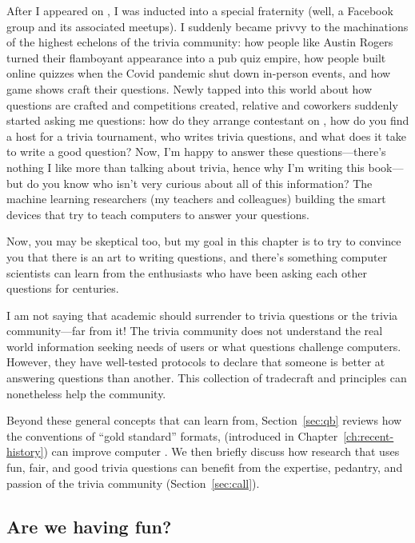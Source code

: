 

After I appeared on \jeopardyp{}, I was inducted into a special fraternity (well, a Facebook group and its associated meetups).
%
I suddenly became privvy to the machinations of the highest echelons of the trivia community: how people like Austin Rogers turned their flamboyant appearance into a pub quiz empire, how people built online quizzes when the Covid pandemic shut down in-person events, and how game shows craft their questions.
%
Newly tapped into this world about how questions are crafted and competitions created, relative and coworkers suddenly started asking me questions: how do they arrange contestant on \jeopardyp{}, how do you find a host for a trivia tournament, who writes trivia questions, and what does it take to write a good question?
%
Now, I'm happy to answer these questions---there's nothing I like more than talking about trivia, hence why I'm writing this book---but do you know who isn't very curious about all of this information?
%
The machine learning researchers (my teachers and colleagues) building the smart devices that try to teach computers to answer your questions.

Now, you may be skeptical too, but my goal in this chapter is to try to convince you that there is an art to writing questions, and there's something computer scientists can learn from the enthusiasts who have been asking each other questions for centuries.


I am not saying that academic  should surrender to trivia questions or the trivia community---far from it!
The trivia community does not understand the real world information seeking needs of users or what questions challenge computers.
However, they have well-tested protocols to declare that someone is better at answering questions than another.
This collection of tradecraft and principles can nonetheless help the  community.

Beyond these general concepts that  can learn from, Section~\ref{sec:qb} reviews how the conventions of ``gold standard'' formats, \qb{} (introduced in Chapter~\ref{ch:recent-history}) can improve computer .
%
We then briefly discuss how research that uses fun, fair, and good trivia questions can benefit from the expertise, pedantry, and passion of the trivia community (Section~\ref{sec:call}).

\subsection{Are we having fun?}
\label{sec:fun}

